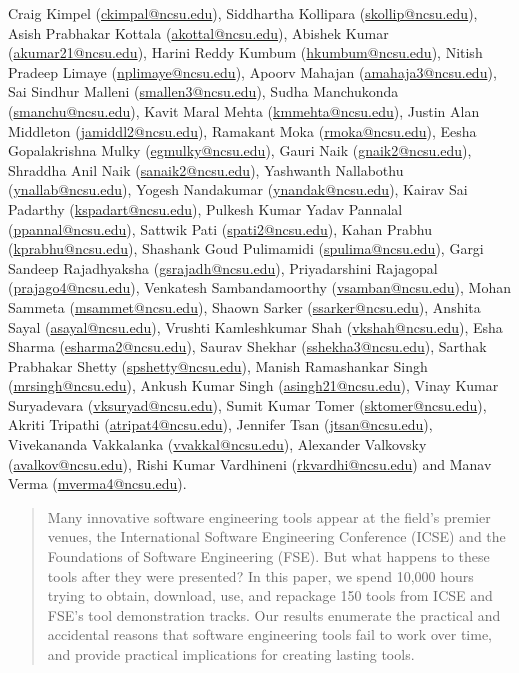 \documentclass{sig-alternate-05-2015}
\begin{document}
{Craig Kimpel (\url{ckimpal@ncsu.edu}), 
Siddhartha Kollipara (\url{skollip@ncsu.edu}), 
Asish Prabhakar Kottala (\url{akottal@ncsu.edu}), 
Abishek Kumar (\url{akumar21@ncsu.edu}), 
Harini Reddy Kumbum (\url{hkumbum@ncsu.edu}), 
Nitish Pradeep Limaye (\url{nplimaye@ncsu.edu}), 
Apoorv Mahajan (\url{amahaja3@ncsu.edu}), 
Sai Sindhur Malleni (\url{smallen3@ncsu.edu}), 
Sudha Manchukonda (\url{smanchu@ncsu.edu}), 
Kavit Maral Mehta (\url{kmmehta@ncsu.edu}), 
Justin Alan Middleton (\url{jamiddl2@ncsu.edu}), 
Ramakant Moka (\url{rmoka@ncsu.edu}), 
Eesha Gopalakrishna Mulky (\url{egmulky@ncsu.edu}), 
Gauri Naik (\url{gnaik2@ncsu.edu}), 
Shraddha Anil Naik (\url{sanaik2@ncsu.edu}), 
Yashwanth Nallabothu (\url{ynallab@ncsu.edu}), 
Yogesh Nandakumar (\url{ynandak@ncsu.edu}), 
Kairav Sai Padarthy (\url{kspadart@ncsu.edu}), 
Pulkesh Kumar Yadav Pannalal (\url{ppannal@ncsu.edu}), 
Sattwik Pati (\url{spati2@ncsu.edu}), 
Kahan Prabhu (\url{kprabhu@ncsu.edu}), 
Shashank Goud Pulimamidi (\url{spulima@ncsu.edu}), 
Gargi Sandeep Rajadhyaksha (\url{gsrajadh@ncsu.edu}), 
Priyadarshini Rajagopal (\url{prajago4@ncsu.edu}), 
Venkatesh Sambandamoorthy (\url{vsamban@ncsu.edu}), 
Mohan Sammeta (\url{msammet@ncsu.edu}), 
Shaown Sarker (\url{ssarker@ncsu.edu}), 
Anshita Sayal (\url{asayal@ncsu.edu}), 
Vrushti Kamleshkumar Shah (\url{vkshah@ncsu.edu}), 
Esha Sharma (\url{esharma2@ncsu.edu}), 
Saurav Shekhar (\url{sshekha3@ncsu.edu}), 
Sarthak Prabhakar Shetty (\url{spshetty@ncsu.edu}), 
Manish Ramashankar Singh (\url{mrsingh@ncsu.edu}), 
Ankush Kumar Singh (\url{asingh21@ncsu.edu}), 
Vinay Kumar Suryadevara (\url{vksuryad@ncsu.edu}), 
Sumit Kumar Tomer (\url{sktomer@ncsu.edu}), 
Akriti Tripathi (\url{atripat4@ncsu.edu}), 
Jennifer Tsan (\url{jtsan@ncsu.edu}), 
Vivekananda Vakkalanka (\url{vvakkal@ncsu.edu}), 
Alexander Valkovsky (\url{avalkov@ncsu.edu}), 
Rishi Kumar Vardhineni (\url{rkvardhi@ncsu.edu}) and
Manav Verma (\url{mverma4@ncsu.edu}).}

\maketitle
\begin{abstract}
Many innovative software engineering tools appear at the field's premier venues, the 
International Software Engineering Conference (ICSE) and the 
Foundations of Software Engineering (FSE).
But what happens to these tools after they were presented?
In this paper, we spend 10,000 hours %
trying to obtain, download, use, and repackage 150 %
tools from ICSE and FSE's tool demonstration tracks.
Our results enumerate the practical and accidental reasons that
software engineering tools fail to work over time,
and provide practical implications for creating lasting tools.
\end{abstract}
\end{document}
